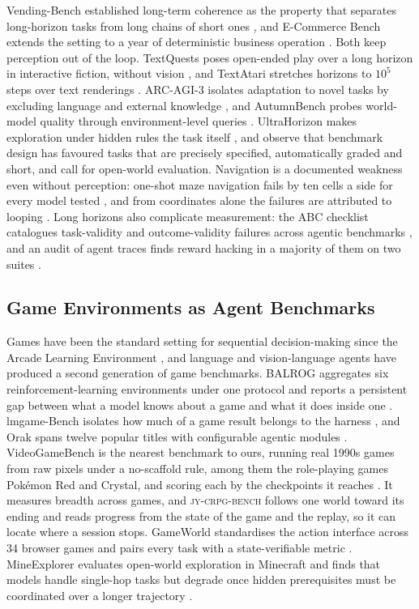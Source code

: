 \documentclass{article} %
\newcommand{\bench}{\textsc{jy-crpg-bench}}
\begin{document}
Vending-Bench established long-term coherence as the property that separates
long-horizon tasks from long chains of short ones
\citep{backlund2025vending}, and E-Commerce Bench extends the setting
to a year of deterministic business operation
\citep{fan2026ecommerce}. Both keep perception out of the loop. TextQuests
poses open-ended play over a long horizon in interactive fiction, without vision \citep{phan2025textquests}, and TextAtari stretches horizons to $10^5$ steps over
text renderings \citep{li2025textatari}. ARC-AGI-3 isolates adaptation to
novel tasks by excluding language and external knowledge
\citep{arc2026arcagi3}, and AutumnBench probes
world-model quality through environment-level queries
\citep{warrier2025benchmarking}. UltraHorizon makes exploration under hidden
rules the task itself \citep{luo2025ultrahorizon}, and \citet{kapoor2026openworld}
observe that benchmark design has favoured tasks that are precisely
specified, automatically graded and short, and call for open-world
evaluation. Navigation is a documented weakness even without perception: one-shot maze navigation fails by ten cells a side for every model tested \citep{jiang2026lostaggregation}, and from coordinates alone the failures are attributed to looping \citep{einarsson2025mazeeval}. Long horizons also complicate measurement: the ABC checklist catalogues task-validity and outcome-validity failures across agentic benchmarks \citep{zhu2025establishing}, and an audit of agent traces finds reward hacking in a majority of them on two suites \citep{shao2026validity}.

\subsection{Game Environments as Agent Benchmarks}

Games have been the standard setting for sequential decision-making since the
Arcade Learning Environment \citep{bellemare2013arcade}, and language and
vision-language agents have produced a second generation of game benchmarks.
BALROG aggregates six reinforcement-learning environments under one protocol
and reports a persistent gap between what a model knows about a game and what
it does inside one \citep{paglieri2025balrog}. lmgame-Bench isolates how much
of a game result belongs to the harness \citep{hu2026lmgame}, and Orak spans
twelve popular titles with configurable agentic modules \citep{park2026orak}.
VideoGameBench is the nearest benchmark to ours, running real 1990s games from raw pixels under a no-scaffold rule, among them the role-playing games Pok\'emon Red and Crystal, and scoring each by the checkpoints it reaches \citep{zhang2025videogamebench}. It measures breadth across games, and \bench{} follows one world toward its ending and reads progress from the state of the game and the replay, so it can locate where a session stops.
GameWorld
standardises the action interface across 34 browser games and pairs every
task with a state-verifiable metric \citep{ouyang2026gameworld}. MineExplorer
evaluates open-world exploration in Minecraft and finds that models handle
single-hop tasks but degrade once hidden prerequisites must be coordinated
over a longer trajectory \citep{ju2026mineexplorer}.
\end{document}

